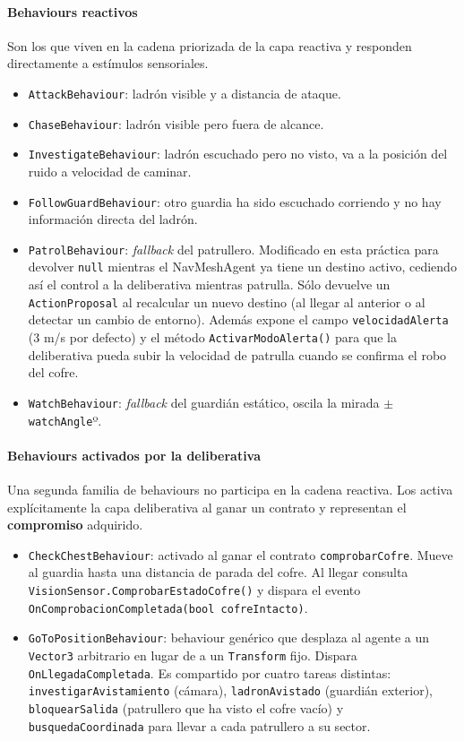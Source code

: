 \documentclass[a4paper,12pt]{article}
\begin{document}
\paragraph{Behaviours reactivos}
Son los que viven en la cadena priorizada de la capa reactiva y responden directamente a estímulos sensoriales.

\begin{itemize}
    \item \texttt{AttackBehaviour}: ladrón visible y a distancia de ataque.
    \item \texttt{ChaseBehaviour}: ladrón visible pero fuera de alcance.
    \item \texttt{InvestigateBehaviour}: ladrón escuchado pero no visto, va a la posición del ruido a velocidad de caminar.
    \item \texttt{FollowGuardBehaviour}: otro guardia ha sido escuchado corriendo y no hay información directa del ladrón.
    \item \texttt{PatrolBehaviour}: \textit{fallback} del patrullero. Modificado en esta práctica para devolver \texttt{null} mientras el NavMeshAgent ya tiene un destino activo, cediendo así el control a la deliberativa mientras patrulla. Sólo devuelve un \texttt{ActionProposal} al recalcular un nuevo destino (al llegar al anterior o al detectar un cambio de entorno). Además expone el campo \texttt{velocidadAlerta} (3 m/s por defecto) y el método \texttt{ActivarModoAlerta()} para que la deliberativa pueda subir la velocidad de patrulla cuando se confirma el robo del cofre.
    \item \texttt{WatchBehaviour}: \textit{fallback} del guardián estático, oscila la mirada $\pm$\texttt{watchAngle}º.
\end{itemize}

\paragraph{Behaviours activados por la deliberativa}
Una segunda familia de behaviours no participa en la cadena reactiva. Los activa explícitamente la capa deliberativa al ganar un contrato y representan el \textbf{compromiso} adquirido.

\begin{itemize}
    \item \texttt{CheckChestBehaviour}: activado al ganar el contrato \texttt{comprobarCofre}. Mueve al guardia hasta una distancia de parada del cofre. Al llegar consulta \texttt{VisionSensor.\allowbreak ComprobarEstadoCofre()} y dispara el evento \texttt{OnComprobacionCompletada(bool cofreIntacto)}.
    \item \texttt{GoToPositionBehaviour}: behaviour genérico que desplaza al agente a un \texttt{Vector3} arbitrario en lugar de a un \texttt{Transform} fijo. Dispara \texttt{OnLlegadaCompletada}. Es compartido por cuatro tareas distintas: \texttt{investigarAvistamiento} (cámara), \texttt{ladronAvistado} (guardián exterior), \texttt{bloquearSalida} (patrullero que ha visto el cofre vacío) y \texttt{busquedaCoordinada} para llevar a cada patrullero a su sector.
\end{itemize}
\end{document}
